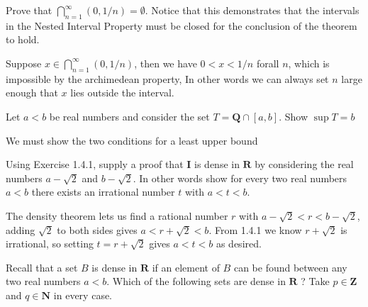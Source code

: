 \begin{exercise}
  Prove that $\bigcap_{n=1}^{\infty}(0,1 / n)=\emptyset$. Notice that this demonstrates that the intervals in the Nested Interval Property must be closed for the conclusion of the theorem to hold.
\end{exercise}

\begin{solution}
  Suppose $x \in \bigcap_{n=1}^\infty (0,1/n)$, then we have $0 < x < 1/n$ forall $n$, which is impossible by the archimedean property, In other words we can always set $n$ large enough that $x$ lies outside the interval.
\end{solution}


\begin{exercise}
  Let $a<b$ be real numbers and consider the set $T=\mathbf{Q} \cap[a, b]$. Show $\sup T=b$
\end{exercise}

\begin{solution}
  We must show the two conditions for a least upper bound
\end{solution}

\begin{exercise}
  Using Exercise 1.4.1, supply a proof that $\mathbf{I}$ is dense in $\mathbf{R}$ by considering the real numbers $a-\sqrt{2}$ and $b-\sqrt{2}$. In other words show for every two real numbers $a<b$ there exists an irrational number $t$ with $a<t<b$.
\end{exercise}

\begin{solution}
  The density theorem lets us find a rational number $r$ with $a-\sqrt2 < r < b-\sqrt2$, adding $\sqrt 2$ to both sides gives $a < r +\sqrt 2< b$. From 1.4.1 we know $r+\sqrt2$ is irrational, so setting $t = r+\sqrt2$ gives $a<t<b$ as desired.
\end{solution}

\begin{exercise}
  Recall that a set $B$ is dense in $\mathbf{R}$ if an element of $B$ can be found between any two real numbers $a<b$. Which of the following sets are dense in $\mathbf{R}$ ? Take $p \in \mathbf{Z}$ and $q \in \mathbf{N}$ in every case.
\end{exercise}

